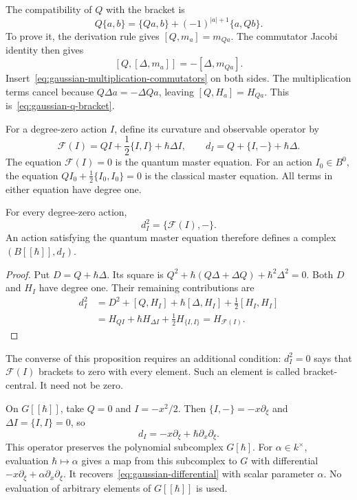 The compatibility of $Q$ with the bracket is
\begin{equation}\label{eq:gaussian-q-bracket}
 Q\{a,b\}=\{Qa,b\}+(-1)^{|a|+1}\{a,Qb\}.
\end{equation}
To prove it, the derivation rule gives $[Q,m_a]=m_{Qa}$.
The commutator Jacobi identity then gives
\[
 [Q,[\Delta,m_a]]=-[\Delta,m_{Qa}].
\]
Insert~\eqref{eq:gaussian-multiplication-commutators} on both sides.
The multiplication terms cancel because $Q\Delta a=-\Delta Qa$,
leaving $[Q,H_a]=H_{Qa}$.
This is~\eqref{eq:gaussian-q-bracket}.

For a degree-zero action $I$, define its curvature and observable operator by
\begin{equation}\label{eq:gaussian-curvature}
 \mathcal F(I)=QI+\frac12\{I,I\}+\hbar\Delta I,
 \qquad d_I=Q+\{I,-\}+\hbar\Delta.
\end{equation}
The equation $\mathcal F(I)=0$ is the quantum master equation.
For an action $I_0\in B^0$, the equation
$QI_0+\tfrac12\{I_0,I_0\}=0$ is the classical master equation.
All terms in either equation have degree one.

\begin{proposition}\label{prop:gaussian-master-square}
For every degree-zero action,
\begin{equation}\label{eq:gaussian-master-square}
 d_I^2=\{\mathcal F(I),-\}.
\end{equation}
An action satisfying the quantum master equation therefore defines a
complex $(B[[\hbar]],d_I)$.
\end{proposition}

\begin{proof}
Put $D=Q+\hbar\Delta$. Its square is
$Q^2+\hbar(Q\Delta+\Delta Q)+\hbar^2\Delta^2=0$.
Both $D$ and $H_I$ have degree one. Their remaining contributions are
\[
 \begin{split}
 d_I^2
 &=D^2+[Q,H_I]+\hbar[\Delta,H_I]+\tfrac12[H_I,H_I]\\
 &=H_{QI}+\hbar H_{\Delta I}+\tfrac12H_{\{I,I\}}
 =H_{\mathcal F(I)}.
 \end{split}
\]
\end{proof}

The converse of this proposition requires an additional condition:
$d_I^2=0$ says that $\mathcal F(I)$ brackets to zero with every element.
Such an element is called bracket-central.
It need not be zero.

On $G[[\hbar]]$, take $Q=0$ and $I=-x^2/2$.
Then $\{I,-\}=-x\partial_\xi$ and $\Delta I=\{I,I\}=0$, so
\[
 d_I=-x\partial_\xi+\hbar\partial_x\partial_\xi.
\]
This operator preserves the polynomial subcomplex $G[\hbar]$.
For $\alpha\in k^\times$, evaluation $\hbar\mapsto\alpha$ gives a
map from this subcomplex to $G$ with differential
$-x\partial_\xi+\alpha\partial_x\partial_\xi$.
It recovers~\eqref{eq:gaussian-differential} with scalar parameter $\alpha$.
No evaluation of arbitrary elements of $G[[\hbar]]$ is used.

